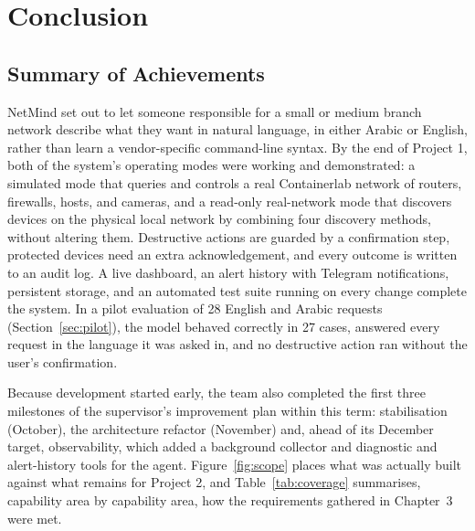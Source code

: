 \chapter{Conclusion}

\section{Summary of Achievements}

NetMind set out to let someone responsible for a small or medium branch
network describe what they want in natural language, in either Arabic or
English, rather than learn a vendor-specific command-line syntax. By the end
of Project 1, both of the system's operating modes were working and
demonstrated: a simulated mode that queries and controls a real Containerlab
network of routers, firewalls, hosts, and cameras, and a read-only
real-network mode that discovers devices on the physical local network by
combining four discovery methods, without altering them. Destructive actions
are guarded by a confirmation step, protected devices need an extra
acknowledgement, and every outcome is written to an audit log. A live
dashboard, an alert history with Telegram notifications, persistent storage,
and an automated test suite running on every change complete the system. In
a pilot evaluation of 28 English and Arabic requests (Section~\ref{sec:pilot}),
the model behaved correctly in 27 cases, answered every request in the
language it was asked in, and no destructive action ran without the user's
confirmation.

Because development started early, the team also completed the first three
milestones of the supervisor's improvement plan within this term:
stabilisation (October), the architecture refactor (November) and, ahead of
its December target, observability, which added a background collector and
diagnostic and alert-history tools for the agent.
Figure~\ref{fig:scope} places what was actually built against what remains
for Project 2, and Table~\ref{tab:coverage} summarises, capability area by
capability area, how the requirements gathered in Chapter~3 were met.

